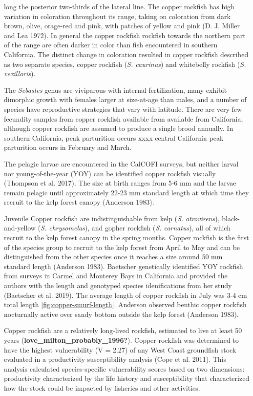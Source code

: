 \documentclass[11pt,
  english,
  letterpaper,
]{article}
\begin{document}
long the posterior two-thirds of the lateral line. The copper rockfish has high variation in coloration throughout its range, taking on coloration from dark brown, olive, orage-red and pink, with patches of yellow and pink (D. J. Miller and Lea 1972). In general the copper rockfish rockfish towards the northern part of the range are often darker in color than fish encountered in southern California. The distinct change in coloration resulted in copper rockfish described as two separate species, copper rockfish (\emph{S. caurinus}) and whitebelly rockfish (\emph{S. vexillaris}).

The \emph{Sebastes} genus are viviparous with internal fertilization, many exhibit dimorphic growth with females larger at size-at-age than males, and a number of species have reproductive strategies that vary with latitude. There are very few fecundity samples from copper rockfish available from available from California, although copper rockfish are assumed to produce a single brood annually. In southern California, peak parturition occurs xxxx central California peak parturition occurs in February and March.

The pelagic larvae are encountered in the CalCOFI surveys, but neither larval nor young-of-the-year (YOY) can be identified copper rockfish visually (Thompson et al. 2017). The size at birth ranges from 5-6 mm and the larvae remain pelagic until approximately 22-23 mm standard length at which time they recruit to the kelp forest canopy (Anderson 1983).

Juvenile Copper rockfish are indistinguishable from kelp (\emph{S. atrovirens}), black-and-yellow (\emph{S. chrysomelas}), and gopher rockfish (\emph{S. carnatus}), all of which recruit to the kelp forest canopy in the spring months. Copper rockfish is the first of the species group to recruit to the kelp forest from April to May and can be distinguished from the other species once it reaches a size around 50 mm standard length (Anderson 1983). Baetscher genetically identified YOY rockfish from surveys in Carmel and Monterey Bays in California and provided the authors with the length and genotyped species idenifications from her study (Baetscher et al. 2019). The average length of copper rockfish in July was 3-4 cm total length \ref{fig:copper-smurf-length}. Anderson observed benthic copper rockfish nocturnally active over sandy bottom outside the kelp forest (Anderson 1983).

Copper rockfish are a relatively long-lived rockfish, estimated to live at least 50 years (\textbf{love\_milton\_probably\_1996?}). Copper rockfish was determined to have the highest vulnerability (V = 2.27) of any West Coast groundfish stock evaluated in a productivity susceptibility analysis (Cope et al. 2011). This analysis calculated species-specific vulnerability scores based on two dimensions: productivity characterized by the life history and susceptibility that characterized how the stock could be impacted by fisheries and other activities.
\end{document}

